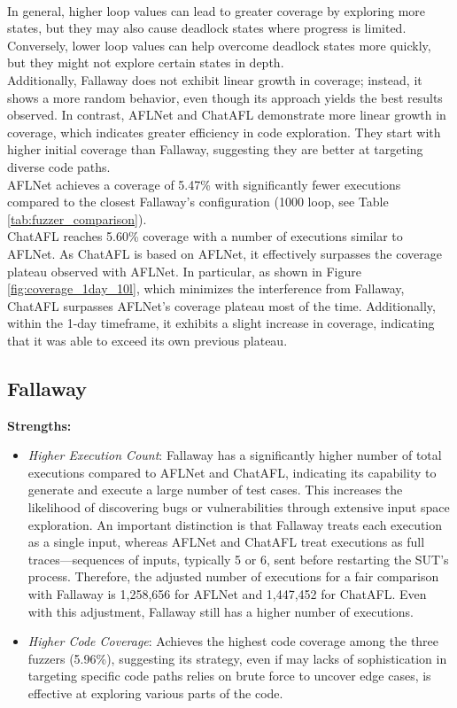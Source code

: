 \\In general, higher loop values can lead to greater coverage by exploring more states, but they may also cause deadlock states where progress is limited. Conversely, lower loop values can help overcome deadlock states more quickly, but they might not explore certain states in depth.
\\Additionally, Fallaway does not exhibit linear growth in coverage; instead, it shows a more random behavior, even though its approach yields the best results observed. In contrast, AFLNet and ChatAFL demonstrate more linear growth in coverage, which indicates greater efficiency in code exploration. They start with higher initial coverage than Fallaway, suggesting they are better at targeting diverse code paths. %
\\AFLNet achieves a coverage of 5.47\% with significantly fewer executions compared to the closest Fallaway's configuration (1000 loop, see Table \ref{tab:fuzzer_comparison}).
\\ChatAFL reaches 5.60\% coverage with a number of executions similar to AFLNet. As ChatAFL is based on AFLNet, it effectively surpasses the coverage plateau observed with AFLNet. In particular, as shown in Figure \ref{fig:coverage_1day_10l}, which minimizes the interference from Fallaway, ChatAFL surpasses AFLNet's coverage plateau most of the time. Additionally, within the 1-day timeframe, it exhibits a slight increase in coverage, indicating that it was able to exceed its own previous plateau.

\subsection{Fallaway}
\label{sec:fallaway_analysis}

\textbf{Strengths:}
\begin{itemize}
    \item \textit{Higher Execution Count}: Fallaway has a significantly higher number of total executions compared to AFLNet and ChatAFL, indicating its capability to generate and execute a large number of test cases. This increases the likelihood of discovering bugs or vulnerabilities through extensive input space exploration. An important distinction is that Fallaway treats each execution as a single input, whereas AFLNet and ChatAFL treat executions as full traces—sequences of inputs, typically 5 or 6, sent before restarting the SUT's process. Therefore, the adjusted number of executions for a fair comparison with Fallaway is 1,258,656 for AFLNet and 1,447,452 for ChatAFL. Even with this adjustment, Fallaway still has a higher number of executions.
    \item \textit{Higher Code Coverage}: Achieves the highest code coverage among the three fuzzers (5.96\%), suggesting its strategy, even if may lacks of  sophistication in targeting specific code paths relies on brute force to uncover edge cases, is effective at exploring various parts of the code.
\end{itemize}

